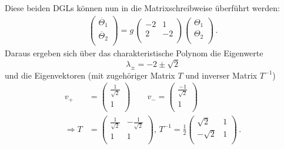 Diese beiden DGLs können nun in die Matrixschreibweise überführt werden:
\begin{equation*}
	\begin{split}
		\begin{pmatrix}
			\ddot{\Theta_1} \\
			\ddot{\Theta_2} \\
		\end{pmatrix}
		= g\,
		\begin{pmatrix}
			-2 & 1 \\
			2 & -2 \\
		\end{pmatrix}
		\begin{pmatrix}
			\Theta_1 \\
			\Theta_2 \\
		\end{pmatrix} \,.
	\end{split}
\end{equation*}
Daraus ergeben sich über das charakteristische Polynom die Eigenwerte
\begin{equation*}
 \lambda_{\pm} = -2 \pm \sqrt{2}
\end{equation*}
und die Eigenvektoren (mit zugehöriger Matrix $T$ und inverser Matrix $T^{-1}$)
\begin{equation*}
	\begin{split}
		v_+ &=
		\begin{pmatrix}
			\frac{1}{\sqrt{2}} \\
			1 \\
		\end{pmatrix}
		\qquad
		v_- =
		\begin{pmatrix}
			\frac{-1}{\sqrt{2}} \\
			1 \\
		\end{pmatrix} \\
		\Rightarrow T &=
		\begin{pmatrix}
				\frac{1}{\sqrt{2}} & -\frac{1}{\sqrt{2}} \\
				1 & 1 \\
		\end{pmatrix},\,
		T^{-1} = \frac{1}{2}
		\begin{pmatrix}
				\sqrt{2} & 1 \\
				-\sqrt{2} & 1 \\
		\end{pmatrix}\, . \\
	\end{split}
\end{equation*}
